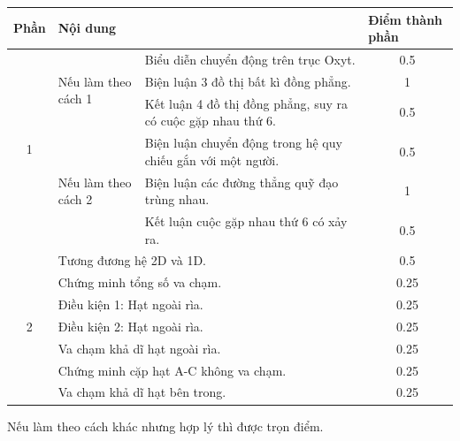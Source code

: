\begin{enumerate}
\begin{center}
\begin{tabular}{|c|p{3.5cm}|p{7.5cm}|c|}
\hline
\multicolumn{1}{|l|}{Phần} &
  \multicolumn{2}{l|}{Nội dung} &
  \multicolumn{1}{l|}{Điểm thành phần} \\ \hline
\multirow{6}{*}{1} &
  \multicolumn{1}{l|}{\multirow{3}{*}{Nếu làm theo cách 1}} &
  Biểu diễn chuyển động trên trục Oxyt. &
  0.5 \\ \cline{3-4} 
                   & \multicolumn{1}{l|}{} & Biện luận 3 đồ thị bất kì đồng phẳng.         & 1    \\ \cline{3-4} 
 &
  \multicolumn{1}{l|}{} &
  Kết luận 4 đồ thị đồng phẳng, suy ra có cuộc gặp nhau thứ 6. &
  0.5 \\ \cline{2-4} 
 &
  \multicolumn{1}{l|}{\multirow{3}{*}{Nếu làm theo cách 2}} &
  Biện luận chuyển động trong hệ quy chiếu gắn với một người. &
  0.5 \\ \cline{3-4} 
                   & \multicolumn{1}{l|}{} & Biện luận các đường thẳng quỹ đạo trùng nhau. & 1    \\ \cline{3-4} 
                   & \multicolumn{1}{l|}{} & Kết luận cuộc gặp nhau thứ 6 có xảy ra.       & 0.5  \\ \hline
\multirow{7}{*}{2} & \multicolumn{2}{l|}{Tương đương hệ 2D và 1D.}                                            & 0.5 \\ \cline{2-4} 
                   & \multicolumn{2}{l|}{Chứng minh tổng số va chạm.}                      & 0.25 \\ \cline{2-4} 
                   & \multicolumn{2}{l|}{Điều kiện 1: Hạt ngoài rìa.}                      & 0.25  \\ \cline{2-4} 
                   & \multicolumn{2}{l|}{Điều kiện 2: Hạt ngoài rìa.}                      & 0.25 \\ \cline{2-4} 
                   & \multicolumn{2}{l|}{Va chạm khả dĩ hạt ngoài rìa.}                    & 0.25 \\ \cline{2-4} 
                   & \multicolumn{2}{l|}{Chứng minh cặp hạt A-C không va chạm.}            & 0.25 \\ \cline{2-4} 
                   & \multicolumn{2}{l|}{Va chạm khả dĩ hạt bên trong.}                    & 0.25 \\ \hline
\end{tabular}

\end{center}
Nếu làm theo cách khác nhưng hợp lý thì được trọn điểm.
\end{enumerate}